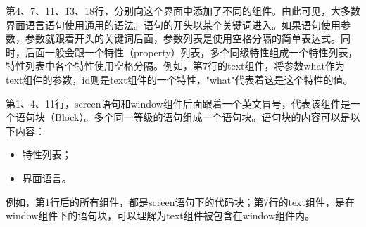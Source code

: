 \documentclass[../../Main.tex]{subfiles}
\begin{document}
第4、7、11、13、18行，分别向这个界面中添加了不同的组件。由此可见，大多数界面语言语句使用通用的语法。语句的开头以某个关键词进入。如果语句使用参数，参数就跟着开头的关键词后面，参数列表是使用空格分隔的简单表达式。同时，后面一般会跟一个特性（property）列表，多个同级特性组成一个特性列表，特性列表中各个特性使用空格分隔。例如，第7行的text组件，将参数what作为text组件的参数，id则是text组件的一个特性，"what"代表着这是这个特性的值。


第1、4、11行，screen语句和window组件后面跟着一个英文冒号，代表该组件是一个语句块（Block）。多个同一等级的语句组成一个语句块。语句块的内容可以是以下内容：

\begin{itemize}
    \item 特性列表；
    \item 界面语言。
\end{itemize}

例如，第1行后的所有组件，都是screen语句下的代码块；第7行的text组件，是在window组件下的语句块，可以理解为text组件被包含在window组件内。
\end{document}
